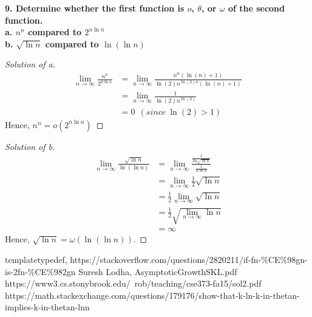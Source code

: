 \documentclass[12pt]{article}
\begin{document}
\noindent \textbf{9. Determine whether the first function is $o$, $\theta$, or $\omega$	of the second function.\\
	a. $n^n$ compared to $2^{n\ln n}$\\
	b. $\sqrt{\ln n}$ compared to $\ln(\ln n)$}
\begin{proof}[Solution of a]
	\begin{align*}
		\lim\limits_{n\to\infty}\frac{n^n}{2^{n\ln n}}&=\lim\limits_{n\to\infty}\frac{n^n(\ln (n)+1)}{\ln(2)n^{\ln(2)n}(\ln(n)+1)}\\
		&=\lim\limits_{n\to\infty}\frac{1}{\ln(2)n^{\ln(2)}}\\
		&=0\ \ (since\ \ln(2)>1)
	\end{align*}
	Hence, $n^n = o(2^{n\ln n})$
\end{proof}
\begin{proof}[Solution of b]
	\begin{align*}
		\lim\limits_{n\to\infty}\frac{\sqrt{\ln n}}{\ln(\ln n)}&=\lim\limits_{n\to\infty}\frac{\frac{1}{2n\sqrt{\ln n}}}{\frac{1}{n\ln n}}\\
		&=\lim\limits_{n\to\infty}\frac{1}{2}\sqrt{\ln n}\\
		&=\frac{1}{2}\lim\limits_{n\to\infty}\sqrt{\ln n}\\
		&=\frac{1}{2}\sqrt{\lim\limits_{n\to\infty}\ln n}\\
		&=\infty
	\end{align*}
	Hence, $\sqrt{\ln n} =\omega(\ln(\ln n))$.
\end{proof}

\bigskip


\begin{thebibliography}{tptf}
	templatetypedef, https://stackoverflow.com/questions/2820211/if-fn-\%CE\%98gn-is-2fn-\%CE\%982gn
	 Suresh Lodha, AsymptoticGrowthSKL.pdf
	 https://www3.cs.stonybrook.edu/~rob/teaching/cse373-fa15/sol2.pdf
	 https://math.stackexchange.com/questions/179176/show-that-k-ln-k-in-thetan-implies-k-in-thetan-lnn
\end{thebibliography}
\end{document}
